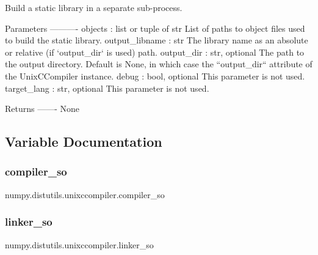 \begin{DoxyVerb}Build a static library in a separate sub-process.

Parameters
----------
objects : list or tuple of str
    List of paths to object files used to build the static library.
output_libname : str
    The library name as an absolute or relative (if `output_dir` is used)
    path.
output_dir : str, optional
    The path to the output directory. Default is None, in which case
    the ``output_dir`` attribute of the UnixCCompiler instance.
debug : bool, optional
    This parameter is not used.
target_lang : str, optional
    This parameter is not used.

Returns
-------
None\end{DoxyVerb}
 

\subsection{Variable Documentation}
\mbox{\label{namespacenumpy_1_1distutils_1_1unixccompiler_a4d031ccc0d3be51da74f486e78eeafed}} 
\subsubsection{\texorpdfstring{compiler\+\_\+so}{compiler\_so}}
{\footnotesize\ttfamily numpy.\+distutils.\+unixccompiler.\+compiler\+\_\+so}

\mbox{\label{namespacenumpy_1_1distutils_1_1unixccompiler_a815b2bca69cc58a19ead0fc700e132f6}} 
\subsubsection{\texorpdfstring{linker\+\_\+so}{linker\_so}}
{\footnotesize\ttfamily numpy.\+distutils.\+unixccompiler.\+linker\+\_\+so}

